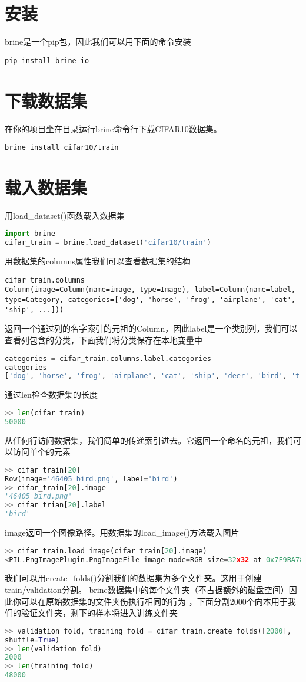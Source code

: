 \documentclass{article}
\begin{document}
\section{安装}
brine是一个pip包，因此我们可以用下面的命令安装

\lstinline[language=Bash]{pip install brine-io}
\section{下载数据集}
在你的项目坐在目录运行brine命令行下载CIFAR10数据集。

\lstinline[language=Bash]{brine install cifar10/train}
\section{载入数据集}
用load\_dataset()函数载入数据集
\begin{lstlisting}[language=Python]
import brine
cifar_train = brine.load_dataset('cifar10/train')
\end{lstlisting}
用数据集的columns属性我们可以查看数据集的结构
\begin{lstlisting}
cifar_train.columns
Column(image=Column(name=image, type=Image), label=Column(name=label, type=Category, categories=['dog', 'horse', 'frog', 'airplane', 'cat', 'ship', ...]))
\end{lstlisting}
返回一个通过列的名字索引的元祖的Column，因此label是一个类别列，我们可以查看列包含的分类，下面我们将分类保存在本地变量中
\begin{lstlisting}[language=Python]
categories = cifar_train.columns.label.categories
categories
['dog', 'horse', 'frog', 'airplane', 'cat', 'ship', 'deer', 'bird', 'truck', 'automobile']
\end{lstlisting}
通过len检查数据集的长度
\begin{lstlisting}[language=Python]
>> len(cifar_train)
50000
\end{lstlisting}
从任何行访问数据集，我们简单的传递索引进去。它返回一个命名的元祖，我们可以访问单个的元素
\begin{lstlisting}[language=Python]
>> cifar_train[20]
Row(image='46405_bird.png', label='bird')
>> cifar_train[20].image
'46405_bird.png'
>> cifar_trian[20].label
'bird'
\end{lstlisting}
image返回一个图像路径。用数据集的load\_image()方法载入图片
\begin{lstlisting}[language=Python]
>> cifar_train.load_image(cifar_train[20].image)
<PIL.PngImagePlugin.PngImageFile image mode=RGB size=32x32 at 0x7F9BA7860D68>
\end{lstlisting}
我们可以用create\_folds()分割我们的数据集为多个文件夹。这用于创建train/validation分割。
brine数据集中的每个文件夹（不占据额外的磁盘空间）因此你可以在原始数据集的文件夹伤执行相同的行为
，下面分割2000个向本用于我们的验证文件夹，剩下的样本将进入训练文件夹
\begin{lstlisting}[language=Python]
>> validation_fold, training_fold = cifar_train.create_folds([2000],
shuffle=True)
>> len(validation_fold)
2000
>> len(training_fold)
48000
\end{lstlisting}
\end{document}
